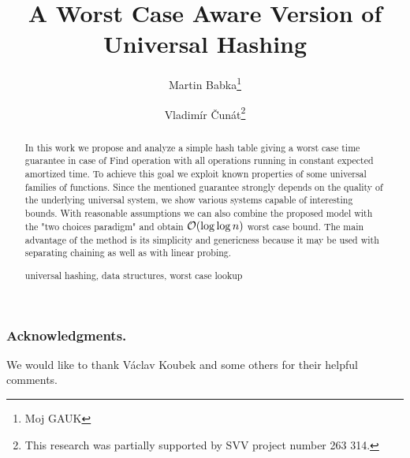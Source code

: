 \documentclass[runningheads,a4paper]{llncs}
\newcommand{\keywords}[1]{\par\addvspace\baselineskip
\noindent\keywordname\enspace\ignorespaces#1}
\begin{document}
\mainmatter

\author{Martin Babka\thanks{Moj GAUK} \and Vladimír Čunát\thanks{This research was partially supported by SVV project number 263 314.}}

\title{A Worst Case Aware Version of Universal Hashing}


\maketitle

\begin{abstract}
In this work we propose and analyze a simple hash table giving a worst case time guarantee in case of Find operation with all operations running in constant expected amortized time.
To achieve this goal we exploit known properties of some universal families of functions.
Since the mentioned guarantee strongly depends on the quality of the underlying universal system, we show various systems capable of interesting bounds.
With reasonable assumptions we can also combine the proposed model with the "two choices paradigm" and obtain $\mathcal{O}(\log \log n)$ worst case bound.
The main advantage of the method is its simplicity and genericness because it may be used with separating chaining as well as with linear probing.

\keywords{universal hashing, data structures, worst case lookup}
\end{abstract}






\subsubsection*{Acknowledgments.}
We would like to thank Václav Koubek and some others for their helpful comments.



\clearpage
% 


\end{document}

